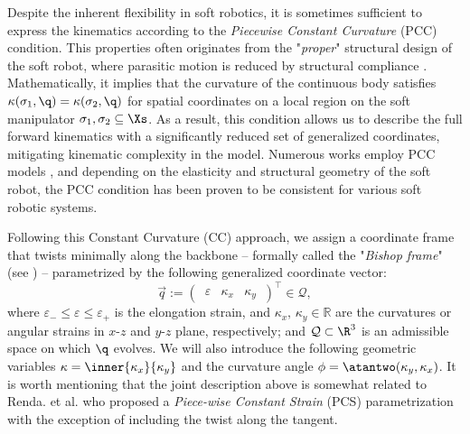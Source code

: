 %
\begin{asm}
\label{asm:C2:pcc}
Despite the inherent flexibility in soft robotics, it is sometimes sufficient to express the kinematics according to the \emph{Piecewise Constant Curvature} (PCC) condition.  This properties often originates from the "\textit{proper}" structural design of the soft robot, where parasitic motion is reduced by structural compliance . Mathematically, it implies that the curvature of the continuous body satisfies $\kappa(\sigma_1,\q) = \kappa(\sigma_2,\q)$ for spatial coordinates on a local region on the soft manipulator $\sigma_1,\sigma_2 \subseteq \Xs$. As a result, this condition allows us to describe the full forward kinematics with a significantly reduced set of generalized coordinates, mitigating kinematic complexity in the model. Numerous works employ PCC models \cite{Falkenhahn2015,Katzschmann2019,Tatlicioglu2007,Marchese2016,Godage2016,DellaSantina2020a}, and depending on the elasticity  and structural geometry of the soft robot, the PCC condition has been proven to be consistent for various soft robotic systems.
\end{asm}
%
{Following this Constant Curvature (CC) approach, we assign a coordinate frame that twists minimally along the backbone -- formally called the "\textit{Bishop frame}" (see \cite{Bishop1975}) -- parametrized by the following generalized coordinate vector:}
%
\begin{equation}
\vec{q} := \begin{pmatrix}
\,\varepsilon & \kappa_x & \kappa_y\,
\end{pmatrix}^\top \in \mathcal{Q},
\label{eq:C2:coordinate}
\end{equation}
%
\noindent where $\varepsilon_{-} \le \varepsilon \le \varepsilon_{+}$ is the elongation strain, and $\kappa_x,\,\kappa_y\in\mathbb{R}$ are the curvatures or angular strains in $x$-$z$ and $y$-$z$ plane, respectively; and $\mathcal{Q} \subset \R^3$ is an admissible space on which $\q$ evolves. We will also introduce the following geometric variables $\kappa = \inner{\kappa_x}{\kappa_y}$ and the curvature angle $\phi = \atantwo(\kappa_y,\kappa_x)$. It is worth mentioning that the joint description above is somewhat related to Renda. et al. \cite{Renda2018} who proposed a \emph{Piece-wise Constant Strain} (PCS) parametrization with the exception of including the twist along the tangent.

